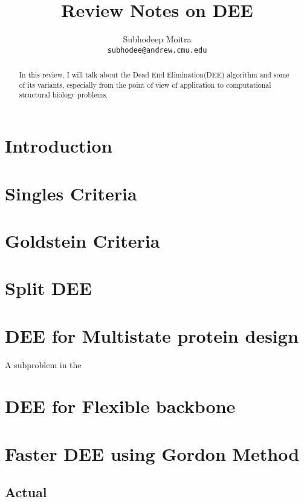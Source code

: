 \documentclass[a4]{article}
\begin{document}
\title{Review Notes on DEE}

\author{Subhodeep Moitra \\ {\tt subhodee@andrew.cmu.edu}}

\maketitle

\begin{abstract}
In this review, I will talk about the Dead End Elimination(DEE) algorithm and some of its variants, especially from the point of view of application to computational structural biology problems.  
\end{abstract}

\section{Introduction}

\section{Singles Criteria}



\section{Goldstein Criteria}


\section{Split DEE}

\section{DEE for Multistate protein design}
A subproblem in the 

\section{DEE for Flexible backbone}

\section{Faster DEE using Gordon Method}


\subsection{Actual}
\end{document}
